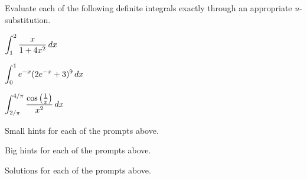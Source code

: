 \begin{activity} \label{A:5.3.3}  Evaluate each of the following definite integrals exactly through an appropriate $u$-substitution.

\ba
	\item $\displaystyle \int_1^2 \frac{x}{1 + 4x^2} \, dx$
	\item $\displaystyle \int_0^1 e^{-x} (2e^{-x}+3)^{9} \, dx$
	\item $\displaystyle \int_{2/\pi}^{4/\pi} \frac{\cos\left(\frac{1}{x}\right)}{x^{2}} \,dx$
\ea
\end{activity}
\begin{smallhint}
\ba
	\item Small hints for each of the prompts above.
\ea
\end{smallhint}
\begin{bighint}
\ba
	\item Big hints for each of the prompts above.
\ea
\end{bighint}
\begin{activitySolution}
\ba
	\item Solutions for each of the prompts above.
\ea
\end{activitySolution}
\aftera